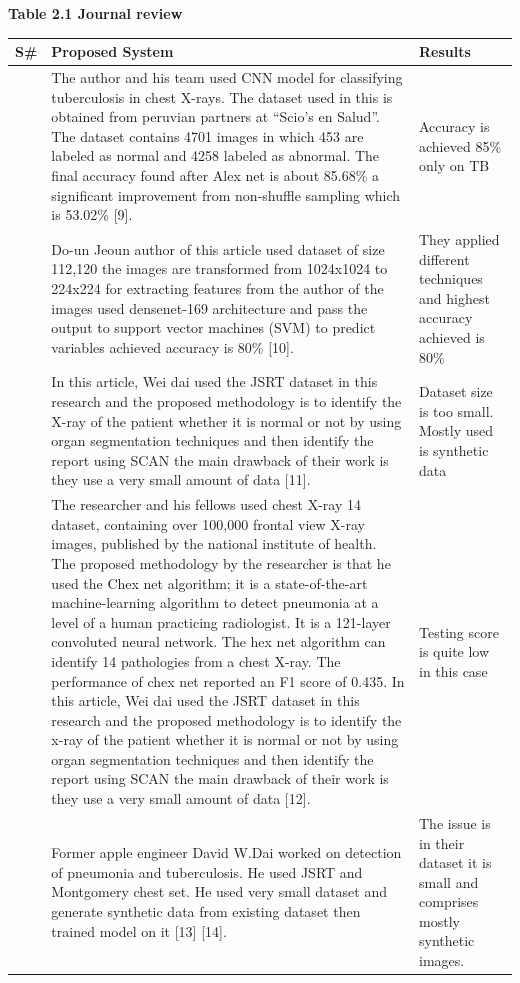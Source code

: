 \documentclass{article} %
\begin{document}
\noindent \textbf{Table 2.1 Journal review}

\begin{tabular}{|p{0.2in}|p{3.2in}|p{1.0in}|} \hline 
\textbf{S\#} & \textbf{Proposed System} & \textbf{Results} \\ \hline 
  & The author and his team used CNN model for classifying tuberculosis in chest X-rays. The dataset used in this is obtained from peruvian partners at ``Scio's en Salud''. The dataset contains 4701 images in which 453 are labeled as normal and 4258 labeled as abnormal. The final accuracy found after Alex net is about 85.68\% a significant improvement from non-shuffle sampling which is 53.02\% [9]. & Accuracy is achieved 85\% only on TB \\ \hline 
  & Do-un Jeoun author of this article used dataset of size 112,120 the images are transformed from 1024x1024 to 224x224 for extracting features from the author of the images used densenet-169 architecture and pass the output to support vector machines (SVM) to predict variables achieved accuracy is 80\% [10]. & They applied different techniques and highest accuracy achieved is 80\% \\ \hline 
  & In this article, Wei dai used the JSRT dataset in this research and the proposed methodology is to identify the X-ray of the patient whether it is normal or not by using organ segmentation techniques and then identify the report using SCAN the main drawback of their work is they use a very small amount of data [11]. & Dataset size is too small. Mostly used is synthetic data \\ \hline 
  & The researcher and his fellows used chest X-ray 14 dataset, containing over 100,000 frontal view X-ray images, published by the national institute of health. The proposed methodology by the researcher is that he used the Chex net algorithm; it is a state-of-the-art machine-learning algorithm to detect pneumonia at a level of a human practicing radiologist. It is a 121-layer convoluted neural network. The hex net algorithm can identify 14 pathologies from a chest X-ray. The performance of chex net reported an F1 score of 0.435. In this article, Wei dai used the JSRT dataset in this research and the proposed methodology is to identify the x-ray of the patient whether it is normal or not by using organ segmentation techniques and then identify the report using SCAN the main drawback of their work is they use a very small amount of data [12]. & Testing score is quite low in this case\newline  \\ \hline 
  &  Former apple engineer David W.Dai worked on detection of pneumonia and tuberculosis. He used JSRT and Montgomery chest set. He used very small dataset and generate synthetic data from existing dataset then trained model on it [13] [14]. & The issue is in their dataset it is small and comprises mostly synthetic images. \\ \hline 
\end{tabular}
\end{document}
